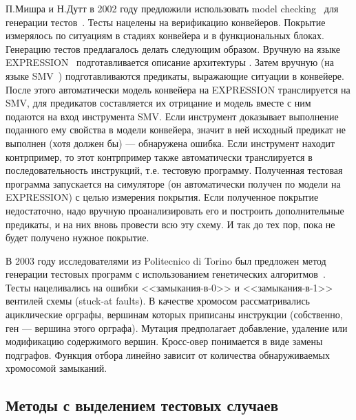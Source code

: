 
П.Мишра и Н.Дутт в 2002 году предложили использовать model checking~\cite{ModelChecking} для генерации тестов~\cite{MishraDutt02}. Тесты нацелены на верификацию конвейеров. Покрытие измерялось по ситуациям в стадиях конвейера и в функциональных блоках. Генерацию тестов предлагалось делать следующим образом. Вручную на языке EXPRESSION~\cite{EXPRESSION} подготавливается описание архитектуры . Затем вручную (на языке SMV~\cite{SMV}) подготавливаются предикаты, выражающие ситуации в конвейере. После этого автоматически модель конвейера на EXPRESSION транслируется на SMV, для предикатов составляется их отрицание и модель вместе с ним подаются на вход инструмента SMV. Если инструмент доказывает выполнение поданного ему свойства в модели конвейера, значит в ней исходный предикат не выполнен (хотя должен бы) --- обнаружена ошибка. Если инструмент находит контрпример, то этот контрпример также автоматически транслируется в последовательность инструкций, т.е. тестовую программу. Полученная тестовая программа запускается на симуляторе (он автоматически получен по модели на EXPRESSION) с целью измерения покрытия. Если полученное покрытие недостаточно, надо вручную проанализировать его и построить дополнительные предикаты, и на них вновь провести всю эту схему. И так до тех пор, пока не будет получено нужное покрытие.

В 2003 году исследователями из Politecnico di Torino был предложен метод генерации тестовых программ с использованием генетических алгоритмов~\cite{microGP}. Тесты нацеливались на ошибки <<замыкания-в-0>> и <<замыкания-в-1>> вентилей схемы (stuck-at faults). В качестве хромосом рассматривались ациклические орграфы, вершинам которых приписаны инструкции (собственно, ген --- вершина этого орграфа). Мутация предполагает добавление, удаление или модификацию содержимого вершин. Кросс-овер понимается в виде замены подграфов. Функция отбора линейно зависит от количества обнаруживаемых хромосомой замыканий.

\subsection{Методы с выделением тестовых случаев}

